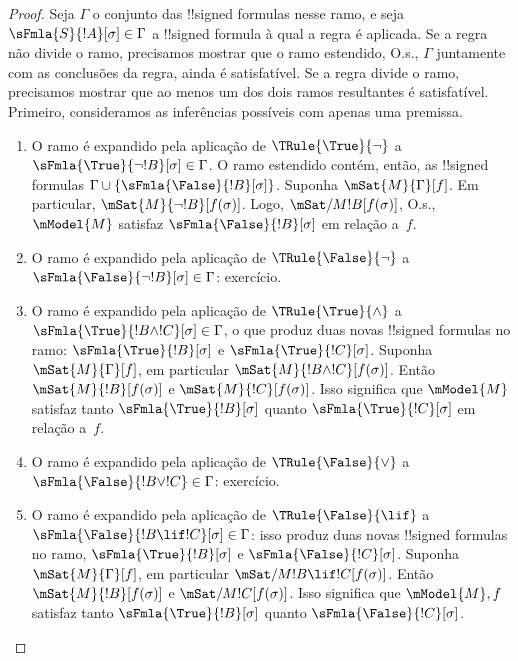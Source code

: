 \documentclass[../../../include/open-logic-section]{subfiles}
\begin{document}
\begin{proof}
Seja $\Gamma$ o conjunto das !!{signed formula}s nesse ramo, e seja
$\sFmla{S}{!A}[\sigma] \in \Gamma$ a !!{signed formula} à qual a regra
é aplicada. Se a regra não divide o ramo, precisamos mostrar que o ramo
estendido, O.s.\@, $\Gamma$ juntamente com as conclusões da regra, ainda
é satisfatível. Se a regra divide o ramo, precisamos mostrar que ao menos
um dos dois ramos resultantes é satisfatível.
Primeiro, consideramos as inferências possíveis com apenas uma premissa.
\begin{enumerate}
\item O ramo é expandido pela aplicação de $\TRule{\True}{\lnot}$ a
  $\sFmla{\True}{\lnot !B}[\sigma] \in \Gamma$. O ramo estendido contém,
  então, as !!{signed formula}s $\Gamma \cup
  \{\sFmla{\False}{!B}[\sigma]\}$. Suponha $\mSat{M}{\Gamma}[f]$. Em
  particular, $\mSat{M}{\lnot !B}[f(\sigma)]$. Logo,
  $\mSat/{M}{!B}[f(\sigma)]$, O.s.\@, $\mModel{M}$ satisfaz
  $\sFmla{\False}{!B}[\sigma]$ em relação a~$f$.
\item O ramo é expandido pela aplicação de $\TRule{\False}{\lnot}$ a
  $\sFmla{\False}{\lnot !B}[\sigma] \in \Gamma$: exercício.
\item O ramo é expandido pela aplicação de $\TRule{\True}{\land}$ a
  $\sFmla{\True}{!B \land !C}[\sigma] \in \Gamma$, o que produz duas
  novas !!{signed formula}s no ramo: $\sFmla{\True}{!B}[\sigma]$ e
  $\sFmla{\True}{!C}[\sigma]$. Suponha $\mSat{M}{\Gamma}[f]$, em
  particular $\mSat{M}{!B \land !C}[f(\sigma)]$. Então
  $\mSat{M}{!B}[f(\sigma)]$ e $\mSat{M}{!C}[f(\sigma)]$. Isso significa
  que $\mModel{M}$ satisfaz tanto $\sFmla{\True}{!B}[\sigma]$ quanto
  $\sFmla{\True}{!C}[\sigma]$ em relação a~$f$.
\item O ramo é expandido pela aplicação de $\TRule{\False}{\lor}$ a
  $\sFmla{\False}{!B \lor !C} \in \Gamma$: exercício.
\item O ramo é expandido pela aplicação de $\TRule{\False}{\lif}$ a
  $\sFmla{\False}{!B \lif !C}[\sigma] \in \Gamma$: isso produz duas
  novas !!{signed formula}s no ramo, $\sFmla{\True}{!B}[\sigma]$ e
  $\sFmla{\False}{!C}[\sigma]$. Suponha $\mSat{M}{\Gamma}[f]$, em
  particular $\mSat/{M}{!B \lif !C}[f(\sigma)]$. Então
  $\mSat{M}{!B}[f(\sigma)]$ e $\mSat/{M}{!C}[f(\sigma)]$. Isso significa
  que $\mModel{M}, f$ satisfaz tanto $\sFmla{\True}{!B}[\sigma]$ quanto
  $\sFmla{\False}{!C}[\sigma]$.

\end{enumerate}
\end{proof}
\end{document}
